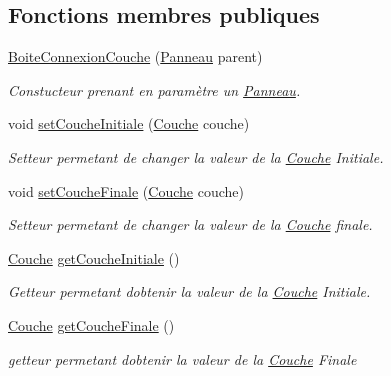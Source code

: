 \subsection*{Fonctions membres publiques}
\begin{DoxyCompactItemize}
\item 
\hyperlink{class_boite_connexion_couche_a69b773ea326589e81c3beba4f8eef4e7}{Boite\+Connexion\+Couche} (\hyperlink{class_panneau}{Panneau} parent)
\begin{DoxyCompactList}\small\item\em Constucteur prenant en paramètre un \hyperlink{class_panneau}{Panneau}. \end{DoxyCompactList}\item 
void \hyperlink{class_boite_connexion_couche_aca89aac7d4ae0ba89828c6d542790925}{set\+Couche\+Initiale} (\hyperlink{class_couche}{Couche} couche)
\begin{DoxyCompactList}\small\item\em Setteur permetant de changer la valeur de la \hyperlink{class_couche}{Couche} Initiale. \end{DoxyCompactList}\item 
void \hyperlink{class_boite_connexion_couche_a9469138a3db603eddacf8757595ad6cf}{set\+Couche\+Finale} (\hyperlink{class_couche}{Couche} couche)
\begin{DoxyCompactList}\small\item\em Setteur permetant de changer la valeur de la \hyperlink{class_couche}{Couche} finale. \end{DoxyCompactList}\item 
\hyperlink{class_couche}{Couche} \hyperlink{class_boite_connexion_couche_a3b0faf67baf198a1abaafc7c469fc6d2}{get\+Couche\+Initiale} ()
\begin{DoxyCompactList}\small\item\em Getteur permetant d\textquotesingle{}obtenir la valeur de la \hyperlink{class_couche}{Couche} Initiale. \end{DoxyCompactList}\item 
\hyperlink{class_couche}{Couche} \hyperlink{class_boite_connexion_couche_af35c756dfc1f9491e2803b251f2d4434}{get\+Couche\+Finale} ()
\begin{DoxyCompactList}\small\item\em getteur permetant d\textquotesingle{}obtenir la valeur de la \hyperlink{class_couche}{Couche} Finale \end{DoxyCompactList}\end{DoxyCompactItemize}


